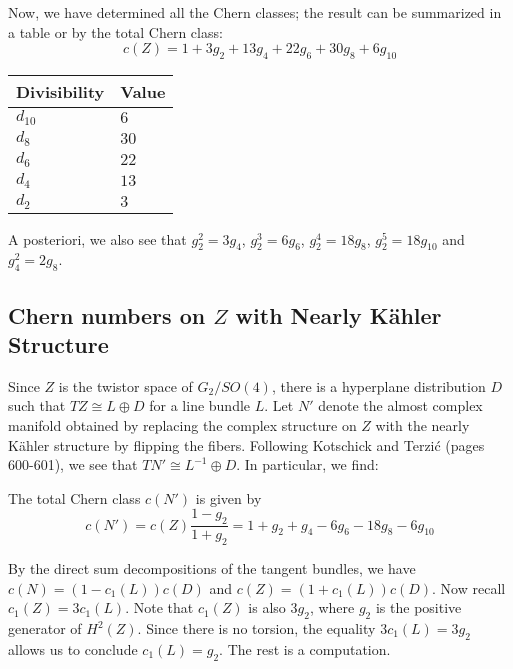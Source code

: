 \documentclass{scrartcl}
\begin{document}
Now, we have determined all the Chern classes; the result can be summarized in a table or by the total Chern class:
\begin{equation*}
	c(Z)=1+3g_2+13g_4+22g_6+30g_8+6g_{10}
\end{equation*}

\begin{table}[ht!]\centering
	\begin{tabular}{ll} \toprule
		Divisibility	& Value \\ \midrule
		$d_{10}$ 		& $6$ \\
		$d_8$ 			& $30$ \\
		$d_6$			& $22$ \\
		$d_4$			& $13$ \\
		$d_2$			& $3$ \\ \bottomrule
	\end{tabular}
\end{table}

A posteriori, we also see that $g_2^2=3g_4$, $g_2^3=6g_6$, $g_2^4=18g_8$, $g_2^5=18g_{10}$ and $g_4^2=2g_8$. 

\subsection{Chern numbers on $Z$ with Nearly K\"{a}hler Structure}

Since $Z$ is the twistor space of $G_2/SO(4)$, there is a hyperplane distribution $D$ such that $TZ\cong L\oplus D$ for a line bundle $L$. Let $N'$ denote the almost complex manifold obtained by replacing the complex structure on $Z$ with the nearly K\"{a}hler structure by flipping the fibers. Following Kotschick and Terzi\'{c} (pages 600-601), we see that $TN'\cong L^{-1}\oplus D$. In particular, we find:
\begin{prop}
	The total Chern class $c(N')$ is given by
	\begin{equation*}
		c(N')=c(Z)\frac{1-g_2}{1+g_2}=1+g_2+g_4-6g_6-18g_8-6g_{10}
	\end{equation*}
\end{prop}
\begin{myproof}
	By the direct sum decompositions of the tangent bundles, we have $c(N)=(1-c_1(L))c(D)$ and $c(Z)=(1+c_1(L))c(D)$. Now recall $c_1(Z)=3c_1(L)$. Note that $c_1(Z)$ is also $3g_2$, where $g_2$ is the positive generator of $H^2(Z)$. Since there is no torsion, the equality $3c_1(L)=3g_2$ allows us to conclude $c_1(L)=g_2$. The rest is a computation.
\end{myproof}
\end{document}
